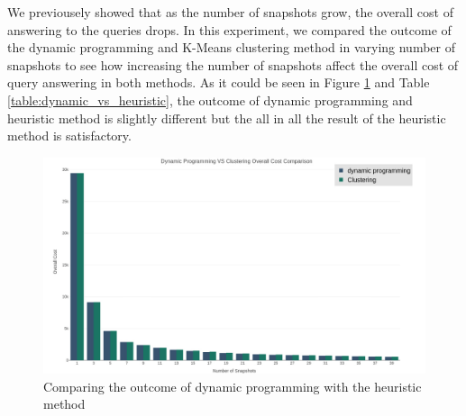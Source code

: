 			We previousely showed that as the number of snapshots grow, the overall cost of answering to the queries drops. In this experiment, we compared the outcome of the dynamic programming and K-Means clustering method in varying number of snapshots to see how increasing the number of snapshots affect the overall cost of query answering in both methods. As it could be seen in Figure \ref{fig:dynamic_vs_heuristic} and Table \ref{table:dynamic_vs_heuristic}, the outcome of dynamic programming and heuristic method is slightly different but the all in all the result of the heuristic method is satisfactory.

			\begin{figure}
				\centering
				\includegraphics[width=\textwidth]{figs/dynamic_vs_clustering.jpg}
				\caption{Comparing the outcome of dynamic programming with the heuristic method}
				\label{fig:dynamic_vs_heuristic}
			\end{figure} 


